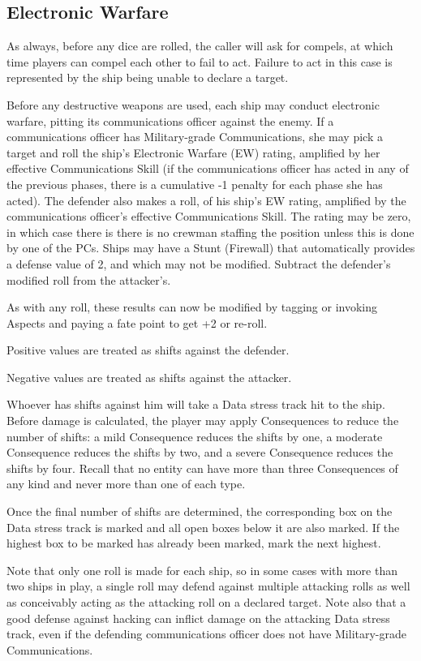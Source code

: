 \subsection{Electronic Warfare}\label{sec:Electronic Warfare}

As always, before any dice are rolled, the caller will ask for compels, at which time players can compel each other to fail to act. Failure to act in this case is represented by the ship being unable to declare a target.

Before any destructive weapons are used, each ship may conduct electronic warfare, pitting its communications officer against the enemy. If a communications officer has Military-grade Communications, she may pick a target and roll the ship's Electronic Warfare (EW) rating, amplified by her effective Communications Skill (if the communications officer has acted in any of the previous phases, there is a cumulative -1 penalty for each phase she has acted). The defender also makes a roll, of his ship's EW rating, amplified by the communications officer's effective Communications Skill. The rating may be zero, in which case there is there is no crewman staffing the position unless this is done by one of the PCs. Ships may have a Stunt (Firewall) that automatically provides a defense value of 2, and which may not be modified. Subtract the defender's modified roll from the attacker's.

As with any roll, these results can now be modified by tagging or invoking Aspects and paying a fate point to get +2 or re-roll.

Positive values are treated as shifts against the defender.

Negative values are treated as shifts against the attacker.

Whoever has shifts against him will take a Data stress track hit to the ship. Before damage is calculated, the player may apply Consequences to reduce the number of shifts: a mild Consequence reduces the shifts by one, a moderate Consequence reduces the shifts by two, and a severe Consequence reduces the shifts by four. Recall that no entity can have more than three Consequences of any kind and never more than one of each type.

Once the final number of shifts are determined, the corresponding box on the Data stress track is marked and all open boxes below it are also marked. If the highest box to be marked has already been marked, mark the next highest.

Note that only one roll is made for each ship, so in some cases with more than two ships in play, a single roll may defend against multiple attacking rolls as well as conceivably acting as the attacking roll on a declared target. Note also that a good defense against hacking can inflict damage on the attacking Data stress track, even if the defending communications officer does not have Military-grade Communications.

